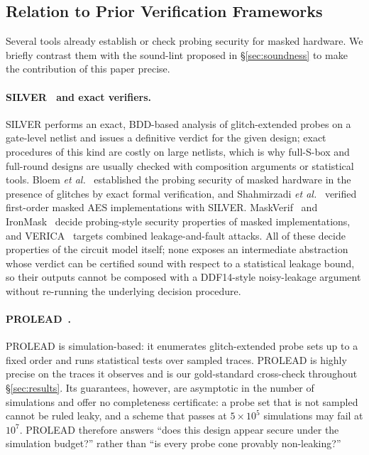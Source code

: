 \documentclass[lettersize,journal]{IEEEtran}
\begin{document}
\subsection{Relation to Prior Verification Frameworks}
\label{sec:prior-verifiers}

Several tools already establish or check probing security for masked
hardware. We briefly contrast them with the sound-lint proposed in
\S\ref{sec:soundness} to make the contribution of this paper precise.

\paragraph{SILVER~\cite{knichel2020silver} and exact verifiers.} SILVER
performs an exact, BDD-based analysis of glitch-extended probes on a
gate-level netlist and issues a definitive verdict for the given
design; exact procedures of this kind are costly on large netlists, which
is why full-S-box and full-round designs are usually checked with
composition arguments or statistical tools. Bloem \emph{et
al.}~\cite{bloem2018formal} established the probing security of masked
hardware in the presence of glitches by exact formal verification, and
Shahmirzadi \emph{et al.}~\cite{shahmirzadi2021records} verified
first-order masked AES implementations with SILVER. MaskVerif~\cite{maskverif2015}
and IronMask~\cite{ironmask2022} decide probing-style security
properties of masked implementations, and VERICA~\cite{verica2022}
targets combined leakage-and-fault attacks. All of these decide
properties of the circuit model itself; none exposes an intermediate
abstraction whose verdict can be certified sound with respect to a
statistical leakage bound, so their outputs cannot be composed with a
DDF14-style noisy-leakage argument without re-running the underlying
decision procedure.

\paragraph{PROLEAD~\cite{muller2022prolead}.} PROLEAD is
simulation-based: it enumerates glitch-extended probe sets up to a
fixed order and runs statistical tests over sampled traces. PROLEAD
is highly precise on the traces it observes and is our
gold-standard cross-check throughout \S\ref{sec:results}. Its
guarantees, however, are asymptotic in the number of simulations
and offer no completeness certificate: a probe set that is not
sampled cannot be ruled leaky, and a scheme that passes at
$5\times10^{5}$ simulations may fail at $10^{7}$. PROLEAD therefore
answers ``does this design appear secure under the simulation
budget?'' rather than ``is every probe cone provably non-leaking?''
\end{document}
